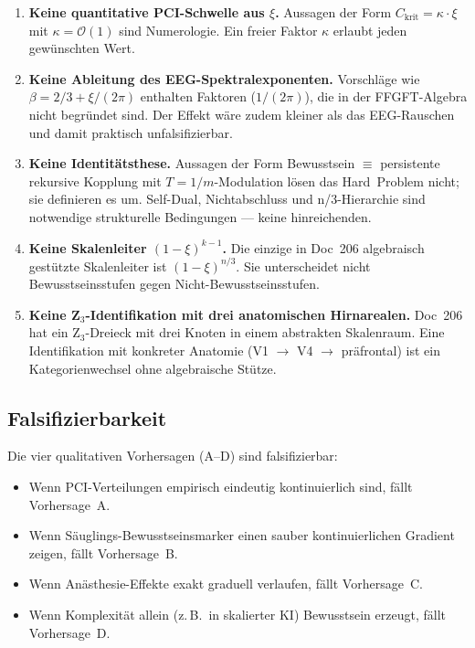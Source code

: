 \begin{enumerate}
\item \textbf{Keine quantitative PCI-Schwelle aus $\xi$.} Aussagen der Form \glqq $C_{\text{krit}} = \kappa \cdot \xi$ mit $\kappa = \mathcal{O}(1)$\grqq{} sind Numerologie. Ein freier Faktor $\kappa$ erlaubt jeden gewünschten Wert.
\item \textbf{Keine Ableitung des EEG-Spektralexponenten.} Vorschläge wie $\beta = 2/3 + \xi/(2\pi)$ enthalten Faktoren ($1/(2\pi)$), die in der FFGFT-Algebra nicht begründet sind. Der Effekt wäre zudem kleiner als das EEG-Rauschen und damit praktisch unfalsifizierbar.
\item \textbf{Keine Identitätsthese.} Aussagen der Form \glqq Bewusstsein $\equiv$ persistente rekursive Kopplung mit $T = 1/m$-Modulation\grqq{} lösen das Hard~Problem nicht; sie definieren es um. Self-Dual, Nichtabschluss und n/3-Hierarchie sind notwendige strukturelle Bedingungen --- keine hinreichenden.
\item \textbf{Keine Skalenleiter $(1-\xi)^{k-1}$.} Die einzige in Doc~206 algebraisch gestützte Skalenleiter ist $(1-\xi)^{n/3}$. Sie unterscheidet nicht \glqq Bewusstseinsstufen\grqq{} gegen \glqq Nicht-Bewusstseinsstufen\grqq{}.
\item \textbf{Keine Z$_3$-Identifikation mit drei anatomischen Hirnarealen.} Doc~206 hat ein Z$_3$-Dreieck mit drei Knoten in einem abstrakten Skalenraum. Eine Identifikation mit konkreter Anatomie (V1 $\to$ V4 $\to$ präfrontal) ist ein Kategorienwechsel ohne algebraische Stütze.
\end{enumerate}

\subsection{Falsifizierbarkeit}\label{sec:vorhersagen_falsifikation}

Die vier qualitativen Vorhersagen (A--D) sind falsifizierbar:

\begin{itemize}
\item Wenn PCI-Verteilungen empirisch eindeutig kontinuierlich sind, fällt Vorhersage~A.
\item Wenn Säuglings-Bewusstseinsmarker einen sauber kontinuierlichen Gradient zeigen, fällt Vorhersage~B.
\item Wenn Anästhesie-Effekte exakt graduell verlaufen, fällt Vorhersage~C.
\item Wenn Komplexität allein (z.\,B.\ in skalierter KI) Bewusstsein erzeugt, fällt Vorhersage~D.
\end{itemize}

